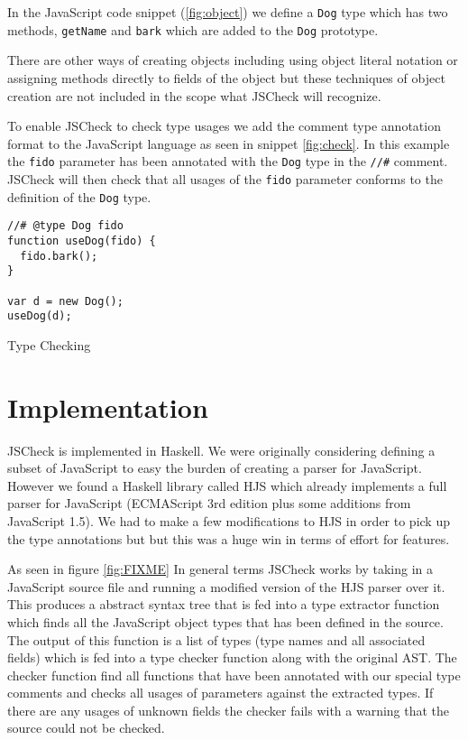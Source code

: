 \documentclass{article}
\begin{document}
In the JavaScript code snippet (\ref{fig:object}) we define a {\tt Dog} type
which has two methods, {\tt getName} and {\tt bark} which are added to the {\tt Dog}
prototype.

There are other ways of creating objects including using object literal notation
or assigning methods directly to fields of the object but these techniques of 
object creation are not included in the scope what JSCheck will recognize.

To enable JSCheck to check type usages we add the comment type annotation
format to the JavaScript language as seen in snippet \ref{fig:check}. In
this example the {\tt fido} parameter has been annotated with the {\tt Dog}
type in the {\tt //\#} comment. JSCheck will then check that all usages of
the {\tt fido} parameter conforms to the definition of the {\tt Dog} type.

\begin{program}
\begin{verbatim}
//# @type Dog fido
function useDog(fido) {
  fido.bark();
}

var d = new Dog();
useDog(d);
\end{verbatim}
\caption{Type Checking}
\label{fig:check}
\end{program}

\section{Implementation}
\label{sec:implementation}
JSCheck is implemented in Haskell. We were originally considering defining a 
subset of JavaScript to easy the burden of creating a parser for JavaScript. 
However we found a Haskell library called HJS \cite{hjsLibrary} 
which already implements a full parser for JavaScript (ECMAScript 3rd edition plus 
some additions from JavaScript 1.5). We had to make a few modifications to
HJS in order to pick up the type annotations but but this was a huge win
in terms of effort for features.

As seen in figure \ref{fig:FIXME} In general terms JSCheck works by taking in a JavaScript source file and running
a modified version of the HJS parser over it. This produces a abstract syntax tree
that is fed into a type extractor function which finds all the JavaScript object types that
has been defined in the source. The output of this function is a list of types (type names and all associated fields)
which is fed into a type checker function along with the original AST. The
checker function find all functions that have been annotated with our special
type comments and checks all usages of parameters against the extracted types. 
If there are any usages of unknown fields the checker fails with a warning that
the source could not be checked.
\end{document}
